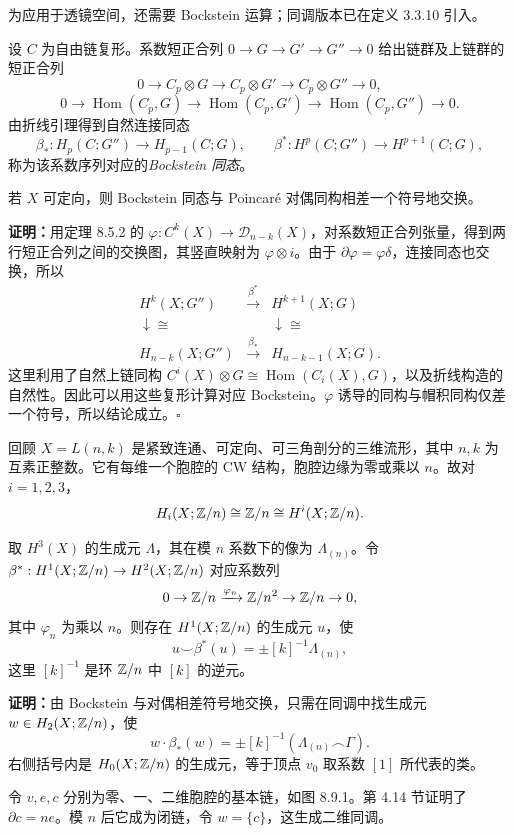 为应用于透镜空间，还需要 Bockstein 运算；同调版本已在定义 3.3.10 引入。

设 $C$ 为自由链复形。系数短正合列 $0\to G\to G'\to G''\to0$ 给出链群及上链群的短正合列
\[
0\to C_p\otimes G\to C_p\otimes G'\to C_p\otimes G''\to0,
\]
\[
0\to\operatorname{Hom}(C_p,G)\to\operatorname{Hom}(C_p,G')\to\operatorname{Hom}(C_p,G'')\to0.
\]
由折线引理得到自然连接同态
\[\beta_*:H_p(C;G'')\to H_{p-1}(C;G),\qquad
\beta^*:H^p(C;G'')\to H^{p+1}(C;G),\]
称为该系数序列对应的\emph{Bockstein 同态}。

若 $X$ 可定向，则 Bockstein 同态与 Poincaré 对偶同构相差一个符号地交换。

\textbf{证明：}用定理 8.5.2 的 $\varphi:C^k(X)\to\mathcal D_{n-k}(X)$，对系数短正合列张量，得到两行短正合列之间的交换图，其竖直映射为 $\varphi\otimes i$。由于 $\partial\varphi=\varphi\delta$，连接同态也交换，所以
\[
\begin{array}{ccc}
H^k(X;G'')&\xrightarrow{\beta^*}&H^{k+1}(X;G)\\
\downarrow\cong&&\downarrow\cong\\
H_{n-k}(X;G'')&\xrightarrow{\beta_*}&H_{n-k-1}(X;G).
\end{array}
\]
这里利用了自然上链同构 $C^i(X)\otimes G\cong\operatorname{Hom}(C_i(X),G)$，以及折线构造的自然性。因此可以用这些复形计算对应 Bockstein。$\varphi$ 诱导的同构与帽积同构仅差一个符号，所以结论成立。\hfill$\square$

回顾 $X=L(n,k)$ 是紧致连通、可定向、可三角剖分的三维流形，其中 $n,k$ 为互素正整数。它有每维一个胞腔的 CW 结构，胞腔边缘为零或乘以 $n$。故对 $i=1,2,3$，
\[H_i(X;\mathbb{Z}/n)\cong\mathbb{Z}/n\cong H^i(X;\mathbb{Z}/n).\]

取 $H^3(X)$ 的生成元 $\Lambda$，其在模 $n$ 系数下的像为 $\Lambda_{(n)}$。令 $\beta^*:H^1(X;\mathbb{Z}/n)\to H^2(X;\mathbb{Z}/n)$ 对应系数列
\[0\to\mathbb{Z}/n\xrightarrow{\varphi_n}\mathbb{Z}/n^2\to\mathbb{Z}/n\to0,\]
其中 $\varphi_n$ 为乘以 $n$。则存在 $H^1(X;\mathbb{Z}/n)$ 的生成元 $u$，使
\[u\smile\beta^*(u)=\pm[k]^{-1}\Lambda_{(n)},\]
这里 $[k]^{-1}$ 是环 $\mathbb{Z}/n$ 中 $[k]$ 的逆元。

\textbf{证明：}由 Bockstein 与对偶相差符号地交换，只需在同调中找生成元 $w\in H_2(X;\mathbb{Z}/n)$，使
\[w\cdot\beta_*(w)=\pm[k]^{-1}(\Lambda_{(n)}\frown\Gamma).\]
右侧括号内是 $H_0(X;\mathbb{Z}/n)$ 的生成元，等于顶点 $v_0$ 取系数 $[1]$ 所代表的类。

令 $v,e,c$ 分别为零、一、二维胞腔的基本链，如图 8.9.1。第 4.14 节证明了 $\partial c=ne$。模 $n$ 后它成为闭链，令 $w=\{c\}$，这生成二维同调。

